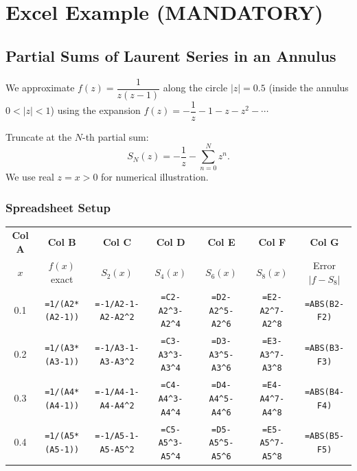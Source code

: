 \documentclass[12pt,a4paper]{article}
\begin{document}
\section{Excel Example (MANDATORY)}

\subsection*{Partial Sums of Laurent Series in an Annulus}

We approximate $f(z) = \dfrac{1}{z(z-1)}$ along the circle $|z| = 0.5$ (inside the annulus
$0 < |z| < 1$) using the expansion $f(z) = -\dfrac{1}{z} - 1 - z - z^2 - \cdots$

Truncate at the $N$-th partial sum:
\[
  S_N(z) = -\frac{1}{z} - \sum_{n=0}^{N} z^n.
\]
We use real $z = x > 0$ for numerical illustration.

\subsubsection*{Spreadsheet Setup}

\begin{center}
\begin{tabular}{ccccccc}
\toprule
\textbf{Col A} & \textbf{Col B} & \textbf{Col C} & \textbf{Col D} & \textbf{Col E} & \textbf{Col F} & \textbf{Col G}\\
$x$ & $f(x)$ exact & $S_2(x)$ & $S_4(x)$ & $S_6(x)$ & $S_8(x)$ & Error $|f - S_8|$ \\
\midrule
0.1 & \texttt{=1/(A2*(A2-1))} & \texttt{=-1/A2-1-A2-A2\^{}2} & \texttt{=C2-A2\^{}3-A2\^{}4} & \texttt{=D2-A2\^{}5-A2\^{}6} & \texttt{=E2-A2\^{}7-A2\^{}8} & \texttt{=ABS(B2-F2)} \\
0.2 & \texttt{=1/(A3*(A3-1))} & \texttt{=-1/A3-1-A3-A3\^{}2} & \texttt{=C3-A3\^{}3-A3\^{}4} & \texttt{=D3-A3\^{}5-A3\^{}6} & \texttt{=E3-A3\^{}7-A3\^{}8} & \texttt{=ABS(B3-F3)} \\
0.3 & \texttt{=1/(A4*(A4-1))} & \texttt{=-1/A4-1-A4-A4\^{}2} & \texttt{=C4-A4\^{}3-A4\^{}4} & \texttt{=D4-A4\^{}5-A4\^{}6} & \texttt{=E4-A4\^{}7-A4\^{}8} & \texttt{=ABS(B4-F4)} \\
0.4 & \texttt{=1/(A5*(A5-1))} & \texttt{=-1/A5-1-A5-A5\^{}2} & \texttt{=C5-A5\^{}3-A5\^{}4} & \texttt{=D5-A5\^{}5-A5\^{}6} & \texttt{=E5-A5\^{}7-A5\^{}8} & \texttt{=ABS(B5-F5)} \\
\bottomrule
\end{tabular}
\end{center}
\end{document}
